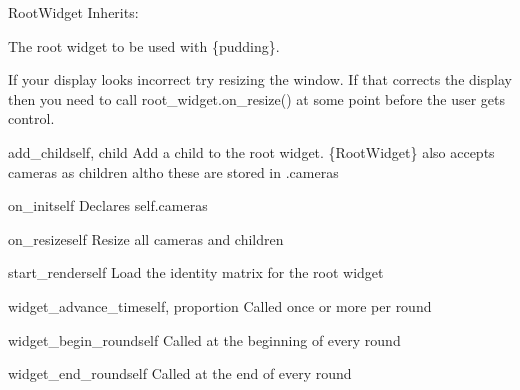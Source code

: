 \begin{classdesc*}{RootWidget}
Inherits:

The root widget to be used with \module\{pudding\}.

If your display looks incorrect try resizing the window. If that corrects 
the display then you need to call root\_widget.on\_resize() at some 
point before the user gets control.

\begin{methoddesc}{add_child}{self, child}
Add a child to the root widget. \class\{RootWidget\} also accepts cameras
as children altho these are stored in .cameras
\end{methoddesc}

\begin{methoddesc}{on_init}{self}
Declares self.cameras
\end{methoddesc}

\begin{methoddesc}{on_resize}{self}
Resize all cameras and children
\end{methoddesc}

\begin{methoddesc}{start_render}{self}
Load the identity matrix for the root widget
\end{methoddesc}

\begin{methoddesc}{widget_advance_time}{self, proportion}
Called once or more per round
\end{methoddesc}

\begin{methoddesc}{widget_begin_round}{self}
Called at the beginning of every round
\end{methoddesc}

\begin{methoddesc}{widget_end_round}{self}
Called at the end of every round
\end{methoddesc}

\end{classdesc*}

